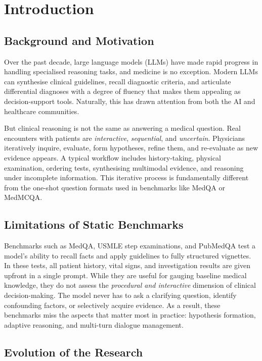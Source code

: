\chapter{Introduction}
\label{Chapter1}

\section{Background and Motivation}

Over the past decade, large language models (LLMs) have made rapid progress in handling specialised reasoning tasks, and medicine is no exception. Modern LLMs can synthesise clinical guidelines, recall diagnostic criteria, and articulate differential diagnoses with a degree of fluency that makes them appealing as decision-support tools. Naturally, this has drawn attention from both the AI and healthcare communities.

But clinical reasoning is not the same as answering a medical question. Real encounters with patients are \textit{interactive}, \textit{sequential}, and \textit{uncertain}. Physicians iteratively inquire, evaluate, form hypotheses, refine them, and re-evaluate as new evidence appears. A typical workflow includes history-taking, physical examination, ordering tests, synthesising multimodal evidence, and reasoning under incomplete information. This iterative process is fundamentally different from the one-shot question formats used in benchmarks like MedQA or MedMCQA.

\section{Limitations of Static Benchmarks}

Benchmarks such as MedQA, USMLE step examinations, and PubMedQA test a model's ability to recall facts and apply guidelines to fully structured vignettes. In these tests, all patient history, vital signs, and investigation results are given upfront in a single prompt. While they are useful for gauging baseline medical knowledge, they do not assess the \textit{procedural and interactive} dimension of clinical decision-making. The model never has to ask a clarifying question, identify confounding factors, or selectively acquire evidence. As a result, these benchmarks miss the aspects that matter most in practice: hypothesis formation, adaptive reasoning, and multi-turn dialogue management.

\section{Evolution of the Research}

